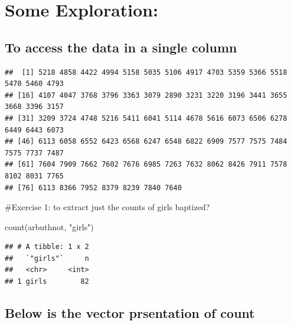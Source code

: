 \documentclass[
]{article}
\newenvironment{Shaded}{\begin{snugshade}}{\end{snugshade}}
\newcommand{\FunctionTok}[1]{\textcolor[rgb]{0.00,0.00,0.00}{#1}}
\newcommand{\NormalTok}[1]{#1}
\newcommand{\SpecialCharTok}[1]{\textcolor[rgb]{0.00,0.00,0.00}{#1}}
\newcommand{\StringTok}[1]{\textcolor[rgb]{0.31,0.60,0.02}{#1}}
\begin{document}
\hypertarget{some-exploration}{%
\section{Some Exploration:}\label{some-exploration}}

\hypertarget{to-access-the-data-in-a-single-column}{%
\subsection{To access the data in a single
column}\label{to-access-the-data-in-a-single-column}}

\begin{Shaded}
\end{Shaded}

\begin{verbatim}
##  [1] 5218 4858 4422 4994 5158 5035 5106 4917 4703 5359 5366 5518 5470 5460 4793
## [16] 4107 4047 3768 3796 3363 3079 2890 3231 3220 3196 3441 3655 3668 3396 3157
## [31] 3209 3724 4748 5216 5411 6041 5114 4678 5616 6073 6506 6278 6449 6443 6073
## [46] 6113 6058 6552 6423 6568 6247 6548 6822 6909 7577 7575 7484 7575 7737 7487
## [61] 7604 7909 7662 7602 7676 6985 7263 7632 8062 8426 7911 7578 8102 8031 7765
## [76] 6113 8366 7952 8379 8239 7840 7640
\end{verbatim}

\#Exercise 1: to extract just the counts of girls baptized?

\begin{Shaded}
\begin{Highlighting}[]
\FunctionTok{count}\NormalTok{(arbuthnot, }\StringTok{"girls"}\NormalTok{)}
\end{Highlighting}
\end{Shaded}

\begin{verbatim}
## # A tibble: 1 x 2
##   `"girls"`     n
##   <chr>     <int>
## 1 girls        82
\end{verbatim}

\hypertarget{below-is-the-vector-prsentation-of-count}{%
\subsection{Below is the vector prsentation of
count}\label{below-is-the-vector-prsentation-of-count}}
\end{document}
